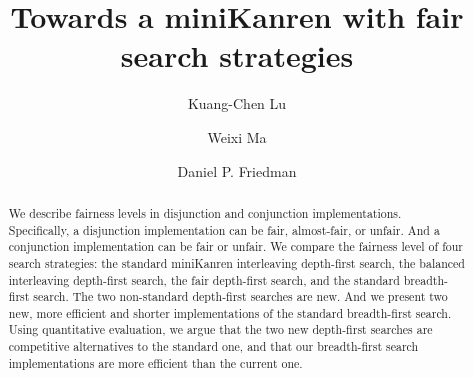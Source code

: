 \documentclass[format=acmlarge, review=true, authordraft=true]{acmart}
\title{Towards a miniKanren with fair search strategies}
\author{Kuang-Chen Lu}
\affiliation{Indiana University}
\author{Weixi Ma}
\affiliation{Indiana University}
\author{Daniel P. Friedman}
\affiliation{Indiana University}
\newcommand{\DFSi }[0]{DFS$_{i}$}
\newcommand{\DFSf }[0]{DFS$_{f}$}
\newcommand{\DFSbi}[0]{DFS$_{bi}$}
\newcommand{\BFSser}[0]{BFS}
\begin{document}

\begin{abstract}




We describe fairness levels in disjunction and conjunction
implementations.  Specifically, a disjunction implementation can be
fair, almost-fair, or unfair. And a conjunction implementation can be
fair or unfair.  We compare the fairness level of four search
strategies: the standard miniKanren interleaving depth-first search,
the balanced interleaving depth-first search, the fair depth-first
search, and the standard breadth-first search.  The two non-standard
depth-first searches are new. And we present two new, more efficient
and shorter implementations of the standard breadth-first search.
Using quantitative evaluation, we argue that the two new depth-first
searches are competitive alternatives to the standard one, and that
our breadth-first search implementations are more efficient than the
current one.



\end{abstract}
\end{document}
